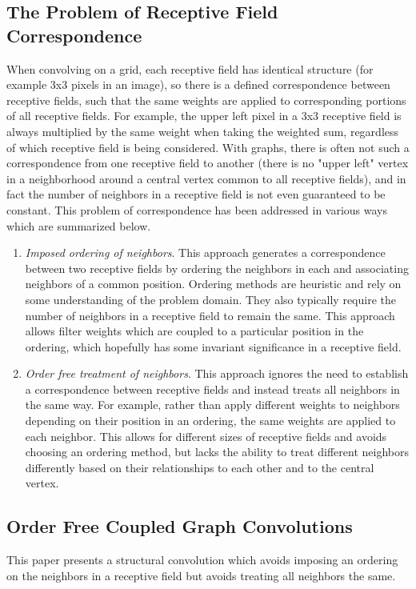 \subsection{The Problem of Receptive Field Correspondence}
When convolving on a grid, each receptive field has identical structure (for example 3x3 pixels in an image), so there is a defined correspondence between receptive fields, such  that the same weights are applied to corresponding portions of all receptive fields. 
For example, the upper left pixel in a 3x3 receptive field is always multiplied by the same weight when taking the weighted sum, regardless of which receptive field is being considered.
With graphs, there is often not such a correspondence from one receptive field to another (there is no "upper left" vertex in a neighborhood around a central vertex common to all receptive fields), and in fact the number of neighbors in a receptive field is not even guaranteed to be constant.
This problem of correspondence has been addressed in various ways which are summarized below.
\begin{enumerate}
	\item \textit{Imposed ordering of neighbors}. This approach generates a correspondence between two receptive fields by ordering the neighbors in each and associating neighbors of a common position. 
	Ordering methods are heuristic and rely on some understanding of the problem domain.
	They also typically require the number of neighbors in a receptive field to remain the same.
	This approach allows filter weights which are coupled to a particular position in the ordering, which hopefully has some invariant significance in a receptive field.
	
	\item \textit{Order free treatment of neighbors}. This approach ignores the need to establish a correspondence between receptive fields and instead treats all neighbors in the same way.
	For example, rather than apply different weights to neighbors depending on their position in an ordering, the same weights are applied to each neighbor.
	This allows for different sizes of receptive fields and avoids choosing an ordering method, but lacks the ability to treat different neighbors differently based on their relationships to each other and to the central vertex.
	
\end{enumerate}


\subsection{Order Free Coupled Graph Convolutions}
This paper presents a structural convolution which avoids imposing an ordering on the neighbors in a receptive field but avoids treating all neighbors the same.

